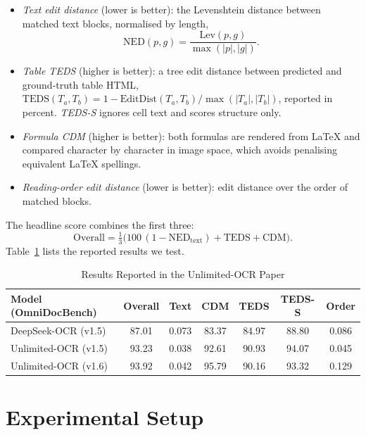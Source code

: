 \documentclass[journal]{IEEEtran}
\begin{document}
\begin{itemize}
\item \emph{Text edit distance} (lower is better): the Levenshtein distance
\cite{levenshtein1966} between matched text blocks, normalised by length,
\begin{equation}
\mathrm{NED}(p,g) = \frac{\mathrm{Lev}(p,g)}{\max(|p|,|g|)}.
\end{equation}
\item \emph{Table TEDS} \cite{zhong2020teds} (higher is better): a tree edit
distance between predicted and ground-truth table HTML,
$\mathrm{TEDS}(T_a,T_b) = 1 - \mathrm{EditDist}(T_a,T_b)/\max(|T_a|,|T_b|)$,
reported in percent. \emph{TEDS-S} ignores cell text and scores structure only.
\item \emph{Formula CDM} \cite{wang2025cdm} (higher is better): both formulas are
rendered from LaTeX and compared character by character in image space, which
avoids penalising equivalent LaTeX spellings.
\item \emph{Reading-order edit distance} (lower is better): edit distance over
the order of matched blocks.
\end{itemize}
The headline score combines the first three:
\begin{equation}
\mathrm{Overall} = \tfrac{1}{3}\bigl(100\,(1-\mathrm{NED}_{\mathrm{text}}) +
\mathrm{TEDS} + \mathrm{CDM}\bigr).
\label{eq:overall}
\end{equation}
Table~\ref{tab:paper} lists the reported results we test.

\begin{table}[!t]
\caption{Results Reported in the Unlimited-OCR Paper \cite{baidu2026unlimited}}
\label{tab:paper}
\centering
\footnotesize
\setlength{\tabcolsep}{3.2pt}
\begin{tabular}{@{}lcccccc@{}}
\toprule
Model (OmniDocBench) & Overall & Text & CDM & TEDS & TEDS-S & Order \\
\midrule
DeepSeek-OCR (v1.5) & 87.01 & 0.073 & 83.37 & 84.97 & 88.80 & 0.086 \\
Unlimited-OCR (v1.5) & 93.23 & 0.038 & 92.61 & 90.93 & 94.07 & 0.045 \\
Unlimited-OCR (v1.6) & 93.92 & 0.042 & 95.79 & 90.16 & 93.32 & 0.129 \\
\bottomrule
\end{tabular}
\end{table}

\section{Experimental Setup}
\end{document}
